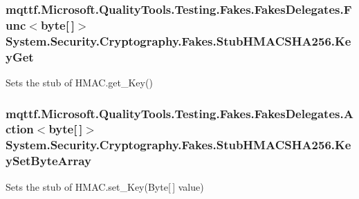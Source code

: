 \hypertarget{class_system_1_1_security_1_1_cryptography_1_1_fakes_1_1_stub_h_m_a_c_s_h_a256_a91f0994373b222944bfd6ef32e9093bd}{
\subsubsection[{Key\-Get}]{\setlength{\rightskip}{0pt plus 5cm}mqttf.\-Microsoft.\-Quality\-Tools.\-Testing.\-Fakes.\-Fakes\-Delegates.\-Func$<$byte\mbox{[}$\,$\mbox{]}$>$ System.\-Security.\-Cryptography.\-Fakes.\-Stub\-H\-M\-A\-C\-S\-H\-A256.\-Key\-Get}}\label{class_system_1_1_security_1_1_cryptography_1_1_fakes_1_1_stub_h_m_a_c_s_h_a256_a91f0994373b222944bfd6ef32e9093bd}


Sets the stub of H\-M\-A\-C.\-get\-\_\-\-Key()

\hypertarget{class_system_1_1_security_1_1_cryptography_1_1_fakes_1_1_stub_h_m_a_c_s_h_a256_a6b39c5fd5e46d2fc3b47e77126175f6d}{
\subsubsection[{Key\-Set\-Byte\-Array}]{\setlength{\rightskip}{0pt plus 5cm}mqttf.\-Microsoft.\-Quality\-Tools.\-Testing.\-Fakes.\-Fakes\-Delegates.\-Action$<$byte\mbox{[}$\,$\mbox{]}$>$ System.\-Security.\-Cryptography.\-Fakes.\-Stub\-H\-M\-A\-C\-S\-H\-A256.\-Key\-Set\-Byte\-Array}}\label{class_system_1_1_security_1_1_cryptography_1_1_fakes_1_1_stub_h_m_a_c_s_h_a256_a6b39c5fd5e46d2fc3b47e77126175f6d}


Sets the stub of H\-M\-A\-C.\-set\-\_\-\-Key(\-Byte\mbox{[}$\,$\mbox{]} value)

